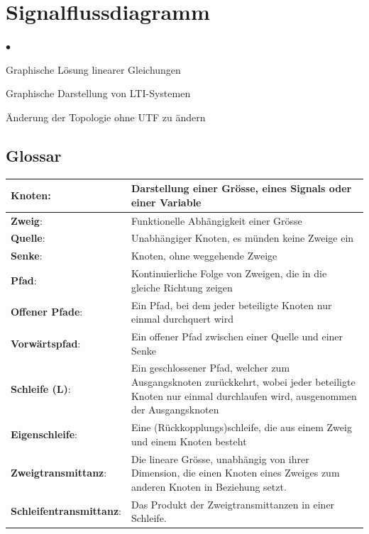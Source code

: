 \section{Signalflussdiagramm }
	\begin{list}{$\bullet$}{\setlength{\itemsep}{0cm} \setlength{\parsep}{0cm} \setlength{\topsep}{0cm}} 
	  \item Graphische Lösung linearer Gleichungen
	  \item Graphische Darstellung von LTI-Systemen
	  \item Änderung der Topologie ohne UTF zu ändern
	\end{list}
	
	\subsection{Glossar }
	  \begin{tabular}{|m{4cm} | m{14cm}|}
	    \hline
	      \textbf{Knoten}: &
	      Darstellung einer Grösse, eines Signals oder einer Variable \\
	    \hline
	      \textbf{Zweig}: &
	      Funktionelle Abhängigkeit einer Grösse \\
	    \hline
	      \textbf{Quelle}: &
	      Unabhängiger Knoten, es münden keine Zweige ein \\
	    \hline
	      \textbf{Senke}: &
	      Knoten, ohne weggehende Zweige \\
	    \hline
	      \textbf{Pfad}: &
	      Kontinuierliche Folge von Zweigen, die in die gleiche Richtung zeigen \\
	    \hline
	      \textbf{Offener Pfade}: &
	      Ein Pfad, bei dem jeder beteiligte Knoten nur einmal durchquert wird \\
	      \textbf{Vorwärtspfad}: &
	      Ein offener Pfad zwischen einer Quelle und einer Senke \\
	    \hline
	      \textbf{Schleife (L)}: &
	      Ein geschlossener Pfad, welcher zum Ausgangsknoten zurückkehrt, 
	      wobei jeder beteiligte Knoten nur einmal durchlaufen wird, ausgenommen der
	      Ausgangsknoten \\
	    \hline
	      \textbf{Eigenschleife}: &
	      Eine (Rückkopplungs)schleife, die aus einem Zweig und einem Knoten besteht \\
	    \hline
	      \textbf{Zweigtransmittanz}: &
	      Die lineare Grösse, unabhängig von ihrer Dimension, 
	      die einen Knoten eines Zweiges zum anderen Knoten in Beziehung setzt. \\
	    \hline
	      \textbf{Schleifentransmittanz}: &
	      Das Produkt der Zweigtransmittanzen in einer Schleife. \\
	    \hline
	  \end{tabular}
	  
